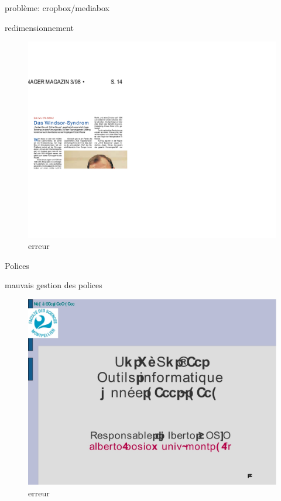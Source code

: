 \begin{frame}{problème: cropbox/mediabox}
	\begin{block}{redimensionnement}
		\begin{figure}[h]
        		\begin{center}
         		\includegraphics[scale=0.08]{images/fail1.jpg} 
        		\end{center}
        		\caption{erreur}
        		\label{erreur}
    		\end{figure}
	\end{block}
\end{frame}

\begin{frame}{Polices}
	\begin{block}{mauvais gestion des polices}
		\begin{figure}[h]
        		\begin{center}
         		\includegraphics[scale=0.17]{images/fail2.jpg} 
        		\end{center}
        		\caption{erreur}
        		\label{erreur}
    		\end{figure}
	\end{block}
\end{frame}

%	

